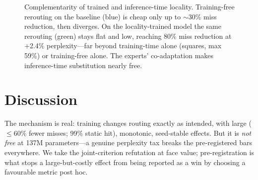 \documentclass[11pt]{article}
\begin{document}
\begin{figure}[t]\centering
{}
\caption{Complementarity of trained and inference-time locality. Training-free
rerouting on the baseline (blue) is cheap only up to $\sim$30\% miss reduction,
then diverges. On the locality-trained model the same rerouting (green) stays
flat and low, reaching 80\% miss reduction at $+$2.4\% perplexity---far beyond
training-time alone (squares, max 59\%) or training-free alone. The experts'
co-adaptation makes inference-time substitution nearly free.}
\label{fig:complementarity}
\end{figure}

\section{Discussion}
The mechanism is real: training changes routing exactly as intended, with large
($\le$60\% fewer misses; 99\% static hit), monotonic, seed-stable effects. But
it is \emph{not free} at 137M parameters---a genuine perplexity tax breaks the
pre-registered bars everywhere. We take the joint-criterion refutation at face
value; pre-registration is what stops a large-but-costly effect from being
reported as a win by choosing a favourable metric post hoc.
\end{document}
